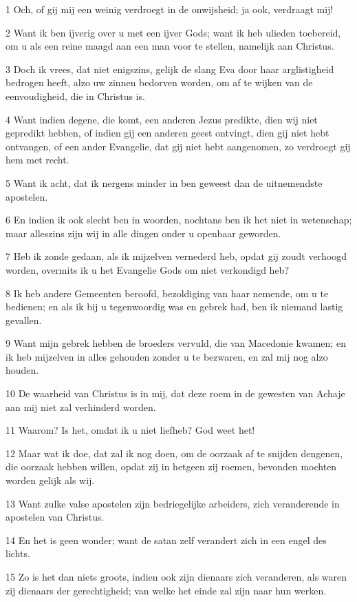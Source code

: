 \par 1 Och, of gij mij een weinig verdroegt in de onwijsheid; ja ook, verdraagt mij!
\par 2 Want ik ben ijverig over u met een ijver Gods; want ik heb ulieden toebereid, om u als een reine maagd aan een man voor te stellen, namelijk aan Christus.
\par 3 Doch ik vrees, dat niet enigszins, gelijk de slang Eva door haar arglistigheid bedrogen heeft, alzo uw zinnen bedorven worden, om af te wijken van de eenvoudigheid, die in Christus is.
\par 4 Want indien degene, die komt, een anderen Jezus predikte, dien wij niet gepredikt hebben, of indien gij een anderen geest ontvingt, dien gij niet hebt ontvangen, of een ander Evangelie, dat gij niet hebt aangenomen, zo verdroegt gij hem met recht.
\par 5 Want ik acht, dat ik nergens minder in ben geweest dan de uitnemendste apostelen.
\par 6 En indien ik ook slecht ben in woorden, nochtans ben ik het niet in wetenschap; maar alleszins zijn wij in alle dingen onder u openbaar geworden.
\par 7 Heb ik zonde gedaan, als ik mijzelven vernederd heb, opdat gij zoudt verhoogd worden, overmits ik u het Evangelie Gods om niet verkondigd heb?
\par 8 Ik heb andere Gemeenten beroofd, bezoldiging van haar nemende, om u te bedienen; en als ik bij u tegenwoordig was en gebrek had, ben ik niemand lastig gevallen.
\par 9 Want mijn gebrek hebben de broeders vervuld, die van Macedonie kwamen; en ik heb mijzelven in alles gehouden zonder u te bezwaren, en zal mij nog alzo houden.
\par 10 De waarheid van Christus is in mij, dat deze roem in de gewesten van Achaje aan mij niet zal verhinderd worden.
\par 11 Waarom? Is het, omdat ik u niet liefheb? God weet het!
\par 12 Maar wat ik doe, dat zal ik nog doen, om de oorzaak af te snijden dengenen, die oorzaak hebben willen, opdat zij in hetgeen zij roemen, bevonden mochten worden gelijk als wij.
\par 13 Want zulke valse apostelen zijn bedriegelijke arbeiders, zich veranderende in apostelen van Christus.
\par 14 En het is geen wonder; want de satan zelf verandert zich in een engel des lichts.
\par 15 Zo is het dan niets groots, indien ook zijn dienaars zich veranderen, als waren zij dienaars der gerechtigheid; van welke het einde zal zijn naar hun werken.
